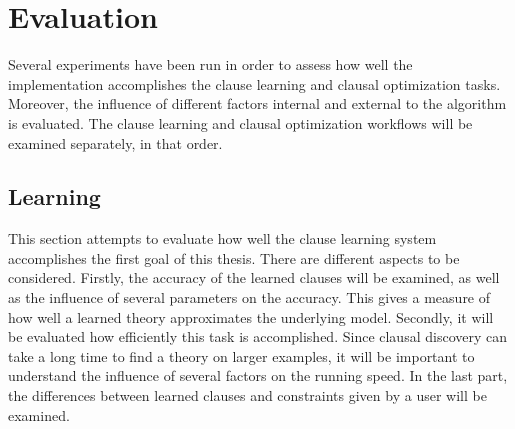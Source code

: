 \chapter{Evaluation}
\label{cha:evaluation}


Several experiments have been run in order to assess how well the implementation accomplishes the clause learning and clausal optimization tasks.
Moreover, the influence of different factors internal and external to the algorithm is evaluated.
The clause learning and clausal optimization workflows will be examined separately, in that order.

\section{Learning}

This section attempts to evaluate how well the clause learning system accomplishes the first goal of this thesis.
There are different aspects to be considered.
Firstly, the accuracy of the learned clauses will be examined, as well as the influence of several parameters on the accuracy.
This gives a measure of how well a learned theory approximates the underlying model.
Secondly, it will be evaluated how efficiently this task is accomplished.
Since clausal discovery can take a long time to find a theory on larger examples, it will be important to understand the influence of several factors on the running speed.
In the last part, the differences between learned clauses and constraints given by a user will be examined.


